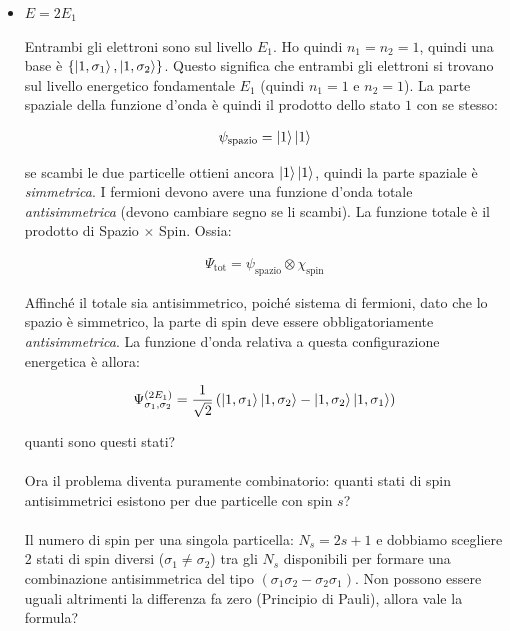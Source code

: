 \begin{itemize}
	\item $E = 2 E_1$
		
		Entrambi gli elettroni sono sul livello $E_1$. Ho quindi $n_1 = n_2 = 1$, quindi una base è $\qty{\ket{1, \sigma_1}, \ket{1, \sigma_2}}$. Questo significa che entrambi gli elettroni si trovano sul livello energetico fondamentale $E_1$ (quindi $n_1=1$ e $n_2=1$). La parte spaziale della funzione d'onda è quindi il prodotto dello stato $1$ con se stesso:
		
	\begin{align*}
		\psi_{\text{spazio}} = \ket{1}\ket{1}
	\end{align*}
	
		se scambi le due particelle ottieni ancora $\ket{1}\ket{1}$, quindi la parte spaziale è \textit{simmetrica}. I fermioni devono avere una funzione d'onda totale \textit{antisimmetrica} (devono cambiare segno se li scambi).
La funzione totale è il prodotto di Spazio $\times$ Spin. Ossia:

	\begin{align*}
		\Psi_{\text{tot}} = \psi_{\text{spazio}} \otimes \chi_{\text{spin}}
	\end{align*}

		Affinché il totale sia antisimmetrico, poiché sistema di fermioni, dato che lo spazio è simmetrico, la parte di spin deve essere obbligatoriamente \textit{antisimmetrica}. La funzione d'onda relativa a questa configurazione energetica è allora:
	
	\begin{align*}
		\Psi_{\sigma_1, \sigma_2}^{\qty(2E_1)} = \frac{1}{\sqrt{2}} \, \qty(\ket{1, \sigma_1} \ket{1, \sigma_2} - \ket{1, \sigma_2} \ket{1, \sigma_1})
	\end{align*}
	
		quanti sono questi stati?
		\\
		\\
		Ora il problema diventa puramente combinatorio: quanti stati di spin antisimmetrici esistono per due particelle con spin $s$?
		\\
		\\
		Il numero di spin per una singola particella: $N_s = 2s + 1$ e dobbiamo scegliere $2$ stati di spin diversi ($\sigma_1 \neq \sigma_2$) tra gli $N_s$ disponibili per formare una combinazione antisimmetrica del tipo $(\sigma_1 \sigma_2 - \sigma_2 \sigma_1)$. Non possono essere uguali altrimenti la differenza fa zero (Principio di Pauli), allora vale la formula?
		

\end{itemize}
